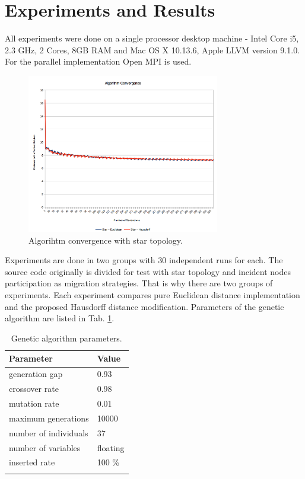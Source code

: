 \documentclass[runningheads]{llncs}
\begin{document}
\section{Experiments and Results}

All experiments were done on a single processor desktop machine - Intel Core i5, 2.3 GHz, 2 Cores, 8GB RAM and Mac OS X 10.13.6, Apple LLVM version 9.1.0. For the parallel implementation Open MPI is used.

\begin{figure}
\includegraphics[width=0.75\textwidth]{fig03.png}
\centering
\caption{Algorihtm convergence with star topology.} \label{fig03}
\end{figure}
\FloatBarrier

Experiments are done in two groups with 30 independent runs for each. The source code originally is divided for test with star topology and incident nodes participation as migration strategies. That is why there are two groups of experiments. Each experiment compares pure Euclidean distance implementation and the proposed Hausdorff distance modification. Parameters of the genetic algorithm are listed in Tab. \ref{tab01}.

\begin{table}
\caption{Genetic algorithm parameters.}
\label{tab01}
\begin{tabular}{p{6.9cm}p{4.4cm}}
\hline\noalign{\smallskip}
\textbf{Parameter} & \textbf{Value} \\
\hline\noalign{\smallskip}
generation gap & 0.93 \\
crossover rate & 0.98 \\
mutation rate & 0.01 \\
maximum generations & 10000 \\
number of individuals & 37 \\
number of variables & floating \\
inserted rate & 100 \% \\
\noalign{\smallskip}\hline\noalign{\smallskip}
\end{tabular}
\end{table}
\FloatBarrier
\end{document}

